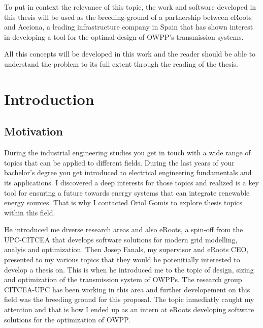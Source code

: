 \documentclass[a4paper,11pt, titlepage, twoside]{article}
\begin{document}
To put in context the relevance of this topic, the work and software developed in this thesis will be used
as the breeding-ground of a partnership between eRoots and Acciona, a leading infrastructure company in Spain that has shown interest in developing a tool for the optimal design
of OWPP's transmission systems.

All this concepts will be developed in this work and the reader should be able to understand the problem to its full extent through the reading of the thesis.






\section{Introduction}\label{Introduction}

\subsection{Motivation}

During the industrial engineering studies you get in touch with a wide range of topics that can be applied
to different fields. During the last years of your bachelor's degree you get introduced to electrical engineering fundamentals and its 
applications. I discovered a deep interests for those topics and realized is a key tool for ensuring a future towards
energy systems that can integrate renewable energy sources. That is why I 
contacted Oriol Gomis to explore thesis topics within this field.\par

He introduced me diverse research areas and also eRoots, a spin-off from the UPC-CITCEA
that develops software solutions for modern grid modelling, analyis and optimization. Then Josep Fanals, my supervisor
and eRoots CEO, presented to my various topics that they would be potenitially interested to develop a thesis on. This is when 
he introduced me to the topic of design, sizing and optimization of the transmission system of OWPPs. The research 
group CITCEA-UPC has been working in this area \cite{paperbase} and further developement on this field was the breeding ground for this proposal.
The topic inmediatly caught my attention and that is how I ended up as an intern at eRoots developing software solutions for the optimization of OWPP.
\end{document}
